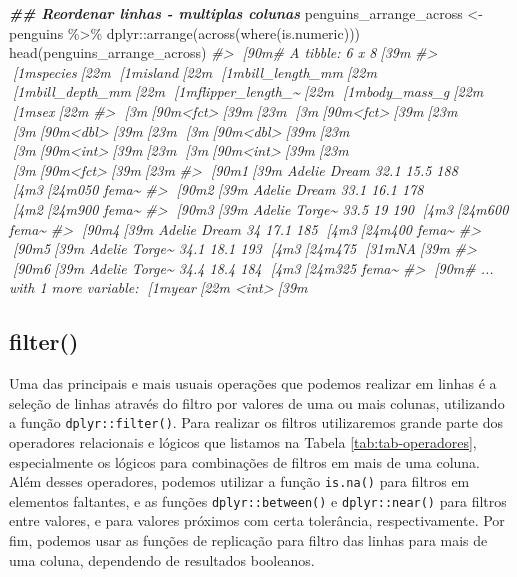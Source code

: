 \documentclass[
]{book}
\newenvironment{Shaded}{\begin{snugshade}}{\end{snugshade}}
\newcommand{\CommentTok}[1]{\textcolor[rgb]{0.37,0.37,0.37}{\textit{#1}}}
\newcommand{\DocumentationTok}[1]{\textcolor[rgb]{0.37,0.37,0.37}{\textbf{\textit{#1}}}}
\newcommand{\FunctionTok}[1]{\textcolor[rgb]{0,0,0}{#1}}
\newcommand{\NormalTok}[1]{#1}
\newcommand{\OtherTok}[1]{\textcolor[rgb]{0.37,0.37,0.37}{#1}}
\newcommand{\SpecialCharTok}[1]{\textcolor[rgb]{0,0,0}{#1}}
\begin{document}
\begin{Shaded}
\begin{Highlighting}[]
\DocumentationTok{\#\# Reordenar linhas {-} multiplas colunas}
\NormalTok{penguins\_arrange\_across }\OtherTok{\textless{}{-}}\NormalTok{ penguins }\SpecialCharTok{\%\textgreater{}\%} 
\NormalTok{  dplyr}\SpecialCharTok{::}\FunctionTok{arrange}\NormalTok{(}\FunctionTok{across}\NormalTok{(}\FunctionTok{where}\NormalTok{(is.numeric)))}
\FunctionTok{head}\NormalTok{(penguins\_arrange\_across)}
\CommentTok{\#\textgreater{} [90m\# A tibble: 6 x 8[39m}
\CommentTok{\#\textgreater{}   [1mspecies[22m [1misland[22m [1mbill\_length\_mm[22m [1mbill\_depth\_mm[22m [1mflipper\_length\_\textasciitilde{}[22m [1mbody\_mass\_g[22m [1msex[22m  }
\CommentTok{\#\textgreater{}   [3m[90m\textless{}fct\textgreater{}[39m[23m   [3m[90m\textless{}fct\textgreater{}[39m[23m           [3m[90m\textless{}dbl\textgreater{}[39m[23m         [3m[90m\textless{}dbl\textgreater{}[39m[23m            [3m[90m\textless{}int\textgreater{}[39m[23m       [3m[90m\textless{}int\textgreater{}[39m[23m [3m[90m\textless{}fct\textgreater{}[39m[23m}
\CommentTok{\#\textgreater{} [90m1[39m Adelie  Dream            32.1          15.5              188        [4m3[24m050 fema\textasciitilde{}}
\CommentTok{\#\textgreater{} [90m2[39m Adelie  Dream            33.1          16.1              178        [4m2[24m900 fema\textasciitilde{}}
\CommentTok{\#\textgreater{} [90m3[39m Adelie  Torge\textasciitilde{}           33.5          19                190        [4m3[24m600 fema\textasciitilde{}}
\CommentTok{\#\textgreater{} [90m4[39m Adelie  Dream            34            17.1              185        [4m3[24m400 fema\textasciitilde{}}
\CommentTok{\#\textgreater{} [90m5[39m Adelie  Torge\textasciitilde{}           34.1          18.1              193        [4m3[24m475 [31mNA[39m   }
\CommentTok{\#\textgreater{} [90m6[39m Adelie  Torge\textasciitilde{}           34.4          18.4              184        [4m3[24m325 fema\textasciitilde{}}
\CommentTok{\#\textgreater{} [90m\# ... with 1 more variable: [1myear[22m \textless{}int\textgreater{}[39m}
\end{Highlighting}
\end{Shaded}

\hypertarget{filter}{%
\subsection{filter()}\label{filter}}

Uma das principais e mais usuais operações que podemos realizar em linhas é a seleção de linhas através do filtro por valores de uma ou mais colunas, utilizando a função \texttt{dplyr::filter()}. Para realizar os filtros utilizaremos grande parte dos operadores relacionais e lógicos que listamos na Tabela \ref{tab:tab-operadores}, especialmente os lógicos para combinações de filtros em mais de uma coluna. Além desses operadores, podemos utilizar a função \texttt{is.na()} para filtros em elementos faltantes, e as funções \texttt{dplyr::between()} e \texttt{dplyr::near()} para filtros entre valores, e para valores próximos com certa tolerância, respectivamente. Por fim, podemos usar as funções de replicação para filtro das linhas para mais de uma coluna, dependendo de resultados booleanos.
\end{document}
